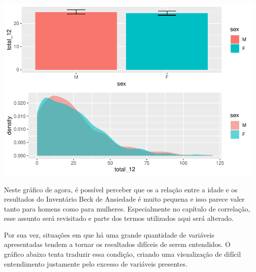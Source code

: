 \documentclass[
]{book}
\newenvironment{Shaded}{\begin{snugshade}}{\end{snugshade}}
\newcommand{\DataTypeTok}[1]{\textcolor[rgb]{0.13,0.29,0.53}{#1}}
\newcommand{\KeywordTok}[1]{\textcolor[rgb]{0.13,0.29,0.53}{\textbf{#1}}}
\newcommand{\NormalTok}[1]{#1}
\newcommand{\OperatorTok}[1]{\textcolor[rgb]{0.81,0.36,0.00}{\textbf{#1}}}
\newcommand{\StringTok}[1]{\textcolor[rgb]{0.31,0.60,0.02}{#1}}
\begin{document}
\begin{center}\includegraphics{gitbook-demo_files/figure-latex/unnamed-chunk-32-1} \end{center}

Neste gráfico de agora, é possível perceber que os a relação entre a
idade e os resultados do Inventário Beck de Ansiedade é muito pequena e
isso parece valer tanto para homens como para mulheres. Especialmente no
capítulo de correlação, esse assunto será revisitado e parte dos termos
utilizados aqui será alterado.

Por sua vez, situações em que há uma grande quantidade de variáveis
apresentadas tendem a tornar os resultados difíceis de serem entendidos.
O gráfico abaixo tenta traduzir essa condição, criando uma visualização
de difícil entendimento justamente pelo excesso de variáveis presentes.

\begin{Shaded}
\end{Shaded}
\end{document}
